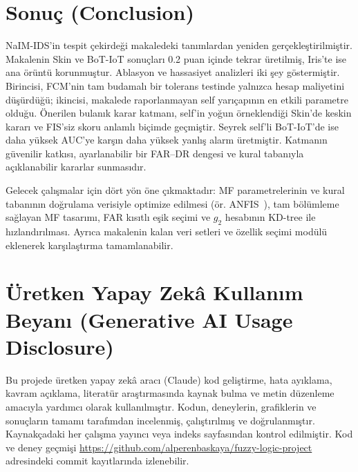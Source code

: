 \documentclass[11pt,a4paper]{article}
\newcommand{\giki}{g_2}
\begin{document}
\section{Sonuç (Conclusion)}

NaIM-IDS'in tespit çekirdeği makaledeki tanımlardan yeniden gerçekleştirilmiştir. Makalenin Skin ve BoT-IoT sonuçları 0.2 puan içinde tekrar üretilmiş, Iris'te ise ana örüntü korunmuştur. Ablasyon ve hassasiyet analizleri iki şey göstermiştir. Birincisi, FCM'nin tam budamalı bir tolerans testinde yalnızca hesap maliyetini düşürdüğü; ikincisi, makalede raporlanmayan self yarıçapının en etkili parametre olduğu. Önerilen bulanık karar katmanı, self'in yoğun örneklendiği Skin'de keskin kararı ve FIS'siz skoru anlamlı biçimde geçmiştir. Seyrek self'li BoT-IoT'de ise daha yüksek AUC'ye karşın daha yüksek yanlış alarm üretmiştir. Katmanın güvenilir katkısı, ayarlanabilir bir FAR--DR dengesi ve kural tabanıyla açıklanabilir kararlar sunmasıdır.

Gelecek çalışmalar için dört yön öne çıkmaktadır: MF parametrelerinin ve kural tabanının doğrulama verisiyle optimize edilmesi (ör. ANFIS~\cite{perez2026}), tam bölümleme sağlayan MF tasarımı, FAR kısıtlı eşik seçimi ve $\giki$ hesabının KD-tree ile hızlandırılması. Ayrıca makalenin kalan veri setleri ve özellik seçimi modülü eklenerek karşılaştırma tamamlanabilir.

\section*{Üretken Yapay Zekâ Kullanım Beyanı (Generative AI Usage Disclosure)}
Bu projede üretken yapay zekâ aracı (Claude) kod geliştirme, hata ayıklama, kavram açıklama, literatür araştırmasında kaynak bulma ve metin düzenleme amacıyla yardımcı olarak kullanılmıştır. Kodun, deneylerin, grafiklerin ve sonuçların tamamı tarafımdan incelenmiş, çalıştırılmış ve doğrulanmıştır. Kaynakçadaki her çalışma yayıncı veya indeks sayfasından kontrol edilmiştir. Kod ve deney geçmişi \url{https://github.com/alperenbaskaya/fuzzy-logic-project} adresindeki commit kayıtlarında izlenebilir.
\end{document}
